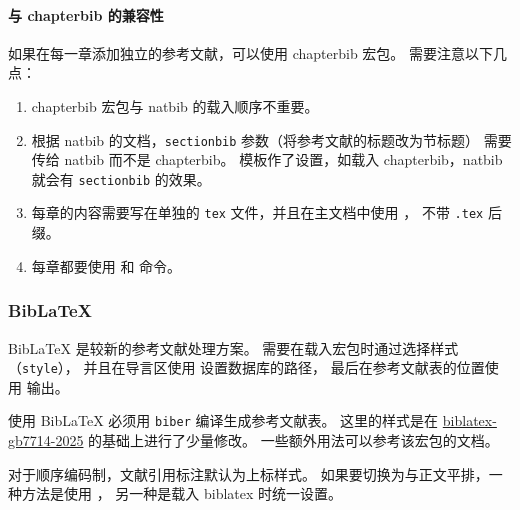 \documentclass[a4paper]{ltxdoc}
\DeclareRobustCommand\file{\nolinkurl}
\DeclareRobustCommand\pkg{\textsf}
\DeclareRobustCommand\opt{\texttt}
\begin{document}
\paragraph{与 \pkg{chapterbib} 的兼容性}
如果在每一章添加独立的参考文献，可以使用 \pkg{chapterbib} 宏包。
需要注意以下几点：
\begin{enumerate}
  \item \pkg{chapterbib} 宏包与 \pkg{natbib} 的载入顺序不重要。
  \item 根据 \pkg{natbib} 的文档，\opt{sectionbib} 参数（将参考文献的标题改为节标题）
    需要传给 \pkg{natbib} 而不是 \pkg{chapterbib}。
    模板作了设置，如载入 \pkg{chapterbib}，\pkg{natbib} 就会有 \opt{sectionbib} 的效果。
  \item 每章的内容需要写在单独的 \file{tex} 文件，并且在主文档中使用 ，
    不带 \file{.tex} 后缀。
  \item 每章都要使用  和  命令。
\end{enumerate}

\subsubsection{BibLaTeX}

BibLaTeX 是较新的参考文献处理方案。
需要在载入宏包时通过选择样式（\opt{style}），
并且在导言区使用  设置数据库的路径，
最后在参考文献表的位置使用  输出。
\begin{latex}
  \usepackage[style=sysuthesis-authoryear]{biblatex}
  
\end{latex}

使用 BibLaTeX 必须用 \file{biber} 编译生成参考文献表。
这里的样式是在 \href{https://ctan.org/pkg/biblatex-gb7714-2015}{biblatex-gb7714-2025}
的基础上进行了少量修改。
一些额外用法可以参考该宏包的文档。

对于顺序编码制，文献引用标注默认为上标样式。
如果要切换为与正文平排，一种方法是使用 ，
另一种是载入 \pkg{biblatex} 时统一设置。
\begin{latex}
  \usepackage[bibstyle=sysuthesis-numeric,
              citestyle=sysuthesis-inline]{biblatex}
\end{latex}
\end{document}
